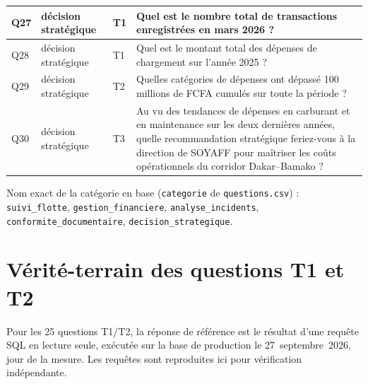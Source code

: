 \begin{longtable}{|>{\raggedright\arraybackslash}p{0.9cm}|>{\raggedright\arraybackslash}p{2.7cm}|>{\raggedright\arraybackslash}p{0.9cm}|>{\raggedright\arraybackslash}p{9.2cm}|}
Q27 & décision stratégique & T1 & Quel est le nombre total de transactions enregistrées en mars 2026 ? \\ \hline
Q28 & décision stratégique & T1 & Quel est le montant total des dépenses de chargement sur l'année 2025 ? \\ \hline
Q29 & décision stratégique & T2 & Quelles catégories de dépenses ont dépassé 100 millions de FCFA cumulés sur toute la période ? \\ \hline
Q30 & décision stratégique & T3 & Au vu des tendances de dépenses en carburant et en maintenance sur les deux dernières années, quelle recommandation stratégique feriez-vous à la direction de SOYAFF pour maîtriser les coûts opérationnels du corridor Dakar--Bamako ? \\ \hline
\end{longtable}

\noindent\footnotesize Nom exact de la catégorie en base (\texttt{categorie} de \texttt{questions.csv}) : \texttt{suivi\_flotte}, \texttt{gestion\_financiere}, \texttt{analyse\_incidents}, \texttt{conformite\_documentaire}, \texttt{decision\_strategique}.
\normalsize

\section{Vérité-terrain des questions T1 et T2}

Pour les 25 questions T1/T2, la réponse de référence est le résultat d'une requête SQL en lecture seule, exécutée sur la base de production le 27~septembre~2026, jour de la mesure. Les requêtes sont reproduites ici pour vérification indépendante.

